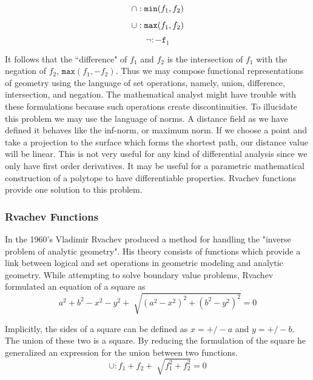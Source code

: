 \begin{equation*}
\cap : \mathtt{min}(f_1,f_2) \\
\end{equation*}
\begin{equation*}
\cup : \mathtt{max}(f_1,f_2) \\
\end{equation*}
\begin{equation*}
\neg : -\mathtt{f}_1
\end{equation*}


It follows that the ``difference"
of $f_1$ and $f_2$ is the intersection of $f_1$ with the negation of $f_2$,
$\mathtt{max}(f_1,-f_2)$. Thus we may compose functional representations
of geometry using the language of set operations, namely, union, difference,
intersection, and negation.
The mathematical analyst might have trouble with these formulations because
such operations create discontinuities. To illucidate this problem we may
use the language of norms. A distance field as we have defined it behaves
like the inf-norm, or maximum norm. If we choose a point and take a projection
to the surface which forms the shortest path, our distance value
will be linear. This is not very useful for any kind of differential
analysis since we only have first order derivatives.
It may be useful for a parametric mathematical construction of a polytope
to have differentiable properties. Rvachev functions
provide one solution to this problem.


\subsubsection{Rvachev Functions}

In the 1960's Vladimir Rvachev produced a method for handling the "inverse
problem of analytic geometry". His theory consists of functions which provide a
link between logical and set operations in geometric modeling and analytic
geometry.\cite{shapiro1991theory} While attempting to solve boundary value problems,
Rvachev formulated an equation of a square as
\begin{equation*}
a^2 + b^2 − x^2 − y^2 + \sqrt[]{( a^2 − x^2 )^2 +( b^2 − y^2 )^2} =0
\end{equation*}

Implicitly, the sides of a square can be defined as $x= +/- a$ and $y= +/- b$.
The union of these two is a square. By reducing the formulation of the square
he generalized an expression for the union between two functions.
\begin{equation*}
\cup : f_1 + f_2 + \sqrt[]{f_1^2 +f_2^2} = 0
\end{equation*}


